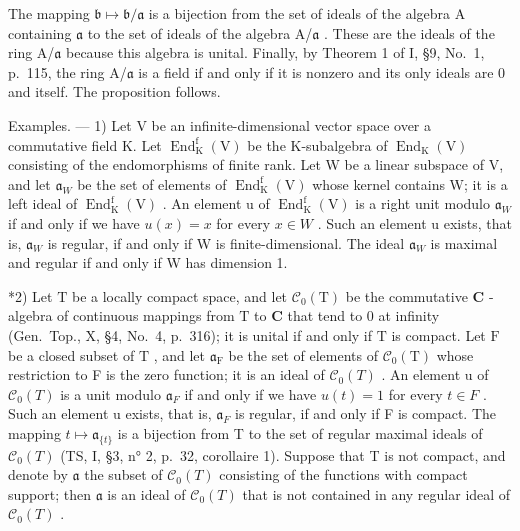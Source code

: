 The mapping \(\mathfrak{b} \mapsto \mathfrak{b}/\mathfrak{a}\) is a bijection from the set of ideals of the algebra A containing \(\mathfrak{a}\) to the set of ideals of the algebra A/\(\mathfrak{a}\) . These are the ideals of the ring A/\(\mathfrak{a}\) because this algebra is unital. Finally, by Theorem 1 of I, §9, No.~1, p.~115, the ring A/\(\mathfrak{a}\) is a field if and only if it is nonzero and its only ideals are 0 and itself. The proposition follows.

Examples. --- 1) Let V be an infinite-dimensional vector space over a commutative field K. Let \(\operatorname{End}_{\mathrm{K}}^{\mathrm{f}}(\mathrm{V})\) be the K-subalgebra of \(\operatorname{End}_{\mathrm{K}}(\mathrm{V})\) consisting of the endomorphisms of finite rank. Let W be a linear subspace of V, and let \(\mathfrak{a}_{W}\) be the set of elements of \(\operatorname{End}_{\mathrm{K}}^{\mathrm{f}}(\mathrm{V})\) whose kernel contains W; it is a left ideal of \(\operatorname{End}_{\mathrm{K}}^{\mathrm{f}}(\mathrm{V})\) . An element u of \(\operatorname{End}_{\mathrm{K}}^{\mathrm{f}}(\mathrm{V})\) is a right unit modulo \(\mathfrak{a}_{W}\) if and only if we have \(u(x)=x\) for every \(x\in W\) . Such an element u exists, that is, \(\mathfrak{a}_{W}\) is regular, if and only if W is finite-dimensional. The ideal \(\mathfrak{a}_{W}\) is maximal and regular if and only if W has dimension 1.

*2) Let \(\mathrm{T}\) be a locally compact space, and let \(\mathcal{C}_0(\mathrm{T})\) be the commutative \(\mathbf{C}\) -algebra of continuous mappings from \(\mathrm{T}\) to \(\mathbf{C}\) that tend to 0 at infinity (Gen.~Top., X, §4, No.~4, p.~316); it is unital if and only if \(\mathrm{T}\) is compact. Let \(\mathrm{F}\) be a closed subset of \(\mathrm{T}\) , and let \(\mathfrak{a}_{\mathrm{F}}\) be the set of elements of \(\mathcal{C}_0(\mathrm{T})\) whose restriction to F is the zero function; it is an ideal of \(\mathcal{C}_{0}(T)\) . An element u of \(\mathcal{C}_{0}(T)\) is a unit modulo \(\mathfrak{a}_{F}\) if and only if we have \(u(t)=1\) for every \(t\in F\) . Such an element u exists, that is, \(\mathfrak{a}_{F}\) is regular, if and only if F is compact. The mapping \(t\mapsto \mathfrak{a}_{\{t\}}\) is a bijection from T to the set of regular maximal ideals of \(\mathcal{C}_{0}(T)\) (TS, I, §3, n° 2, p.~32, corollaire 1). Suppose that T is not compact, and denote by \(\mathfrak{a}\) the subset of \(\mathcal{C}_{0}(T)\) consisting of the functions with compact support; then \(\mathfrak{a}\) is an ideal of \(\mathcal{C}_{0}(T)\) that is not contained in any regular ideal of \(\mathcal{C}_{0}(T)\) .

